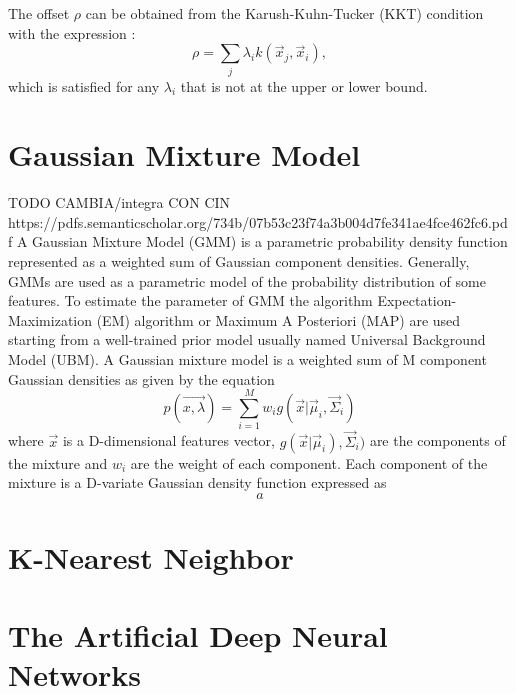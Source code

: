 The offset $\rho$ can be obtained from the Karush-Kuhn-Tucker (KKT) condition with the expression \cite{boyd2004convex}:
\begin{equation}
\rho = \sum_j \lambda_i k(\vec{x}_j,\vec{x}_i),
\end{equation}
which is satisfied for any $\lambda_i$ that is not at the upper or lower bound.



\section{Gaussian Mixture Model} TODO CAMBIA/integra CON CIN
https://pdfs.semanticscholar.org/734b/07b53c23f74a3b004d7fe341ae4fce462fc6.pdf
A Gaussian Mixture Model (GMM) is a parametric probability density function represented as a weighted sum of Gaussian component densities. Generally, GMMs are used as a parametric model of the probability distribution of some features.  To estimate the parameter of GMM the algorithm Expectation-Maximization (EM) algorithm or Maximum A Posteriori (MAP)  are used starting from a well-trained prior model usually named Universal Background Model (UBM).
A Gaussian mixture model is a weighted sum of M component Gaussian densities as given by the equation
\begin{equation}
p(\vec{x, \lambda}) = \sum_{i = 1}^{M} w_i g(\vec{x} |\vec{\mu}_i, \vec{\Sigma}_i)
\end{equation}
where $\vec{x}$ is a D-dimensional features vector, $g (\vec{x} |\vec{\mu}_i), \vec{\Sigma}_i)$ are the components of the mixture and $w_i$ are the weight of each component. Each component of the mixture is a D-variate Gaussian density function expressed as
\begin{equation}
a
\end{equation}
\section{K-Nearest Neighbor}




















\section{The Artificial Deep Neural Networks}

